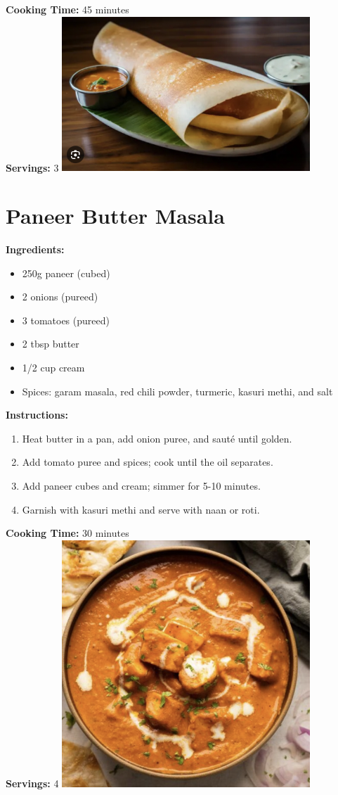 \documentclass[12pt]{article}
\begin{document}
\textbf{Cooking Time:} 45 minutes \\
\textbf{Servings:} 3
\includegraphics[width=0.7\textwidth]{masala_dosa.png} 
\newpage

\section*{Paneer Butter Masala}
\textbf{Ingredients:}
\begin{itemize}
    \item 250g paneer (cubed)
    \item 2 onions (pureed)
    \item 3 tomatoes (pureed)
    \item 2 tbsp butter
    \item 1/2 cup cream
    \item Spices: garam masala, red chili powder, turmeric, kasuri methi, and salt
\end{itemize}

\textbf{Instructions:}
\begin{enumerate}
    \item Heat butter in a pan, add onion puree, and sauté until golden.
    \item Add tomato puree and spices; cook until the oil separates.
    \item Add paneer cubes and cream; simmer for 5-10 minutes.
    \item Garnish with kasuri methi and serve with naan or roti.
\end{enumerate}

\textbf{Cooking Time:} 30 minutes \\
\textbf{Servings:} 4
\includegraphics[width=0.7\textwidth]{paneer_butter_masala.png} 
\newpage
\end{document}
